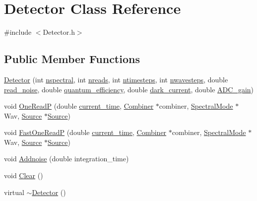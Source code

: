 \hypertarget{classDetector}{
\section{Detector Class Reference}
\label{classDetector}
}


{\ttfamily \#include $<$Detector.h$>$}

\subsection*{Public Member Functions}
\begin{DoxyCompactItemize}
\item 
\hyperlink{classDetector_a59e4a9ab2c51505abae515442940f58d}{Detector} (int \hyperlink{classDetector_a83edf838e8d00d2286e2e75f54836601}{nspectral}, int \hyperlink{classDetector_aab6efccaea99c3467b6e0082a7922cb8}{nreads}, int \hyperlink{classDetector_ada81397b9b56b728a7a6d20b48d40e2d}{ntimesteps}, int \hyperlink{classDetector_aa5e5de28e589cc3cee8ee535ba03d34a}{nwavesteps}, double \hyperlink{classDetector_a8eca17062f19ec98b728af67752abf6f}{read\_\-noise}, double \hyperlink{classDetector_a4a830152b9beb393e26f8f2e26fda464}{quantum\_\-efficiency}, double \hyperlink{classDetector_a8c0b7234e4b96407d8648a42efec4371}{dark\_\-current}, double \hyperlink{classDetector_adb18913ba2480228ee13611040ad7bfe}{ADC\_\-gain})
\item 
void \hyperlink{classDetector_a65dc093ac969e95438a8b8e29cf316f0}{OneReadP} (double \hyperlink{classDetector_a7d1a73b930a0cdc646e9d5e7a75f28e7}{current\_\-time}, \hyperlink{classCombiner}{Combiner} $\ast$combiner, \hyperlink{classSpectralMode}{SpectralMode} $\ast$Wav, \hyperlink{classSource}{Source} $\ast$\hyperlink{classSource}{Source})
\item 
void \hyperlink{classDetector_adfc83c9c00ad09756eb5a26c167cbb62}{FastOneReadP} (double \hyperlink{classDetector_a7d1a73b930a0cdc646e9d5e7a75f28e7}{current\_\-time}, \hyperlink{classCombiner}{Combiner} $\ast$combiner, \hyperlink{classSpectralMode}{SpectralMode} $\ast$Wav, \hyperlink{classSource}{Source} $\ast$\hyperlink{classSource}{Source})
\item 
void \hyperlink{classDetector_a266b4ed766484ef67e533bd163d5b597}{Addnoise} (double integration\_\-time)
\item 
void \hyperlink{classDetector_a57e174c4021b6a66f285ba63dfba1070}{Clear} ()
\item 
virtual \hyperlink{classDetector_ae16b7bf62f39cb287927d56ca17663d7}{$\sim$Detector} ()
\end{DoxyCompactItemize}
